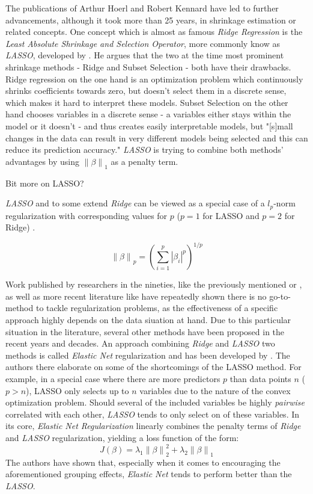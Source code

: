 \documentclass[12pt,a4paper]{article}
\newenvironment{lightbluebox}{%
    \begin{tcolorbox}[colback=lightblue, colframe=lightblue, fontupper=\itshape]%
}{%
    \end{tcolorbox}%
}
\newcommand{\norm}[1]{\left\lVert#1\right\rVert}
\begin{document}
The publications of Arthur Hoerl and Robert Kennard have led to further advancements, although it took more than 25 years, in shrinkage estimation or related concepts. One concept which is almost as famous \textit{Ridge Regression} is the \textit{Least Absolute Shrinkage and Selection Operator}, more commonly know as \textit{LASSO}, developed by \textcite{Tibishirani1996}. He argues that the two at the time most prominent shrinkage methods - Ridge and Subset Selection - both have their drawbacks. Ridge regression on the one hand is an optimization problem which continuously shrinks coefficients towards zero, but doesn't select them in a discrete sense, which makes it hard to interpret these models. Subset Selection on the other hand chooses variables in a discrete sense - a variables either stays within the model or it doesn't - and thus creates easily interpretable models, but "[s]mall changes in the data can result in very different models being selected and this can reduce its prediction accuracy." \parencite{Tibishirani1996} \textit{LASSO} is trying to combine both methods' advantages by using $\norm{\beta}_1$ as a penalty term.\\
\begin{lightbluebox}
Bit more on LASSO?
\end{lightbluebox}

\textit{LASSO} and to some extend \textit{Ridge} can be viewed as a special case of a $l_p$-norm regularization with corresponding values for $p$ ($p = 1$ for LASSO and $p=2$ for Ridge) \parencite{FrankFriedman1993}. 

$$\norm{\beta}_p =  \left(\sum_{i=1}^p|\beta_i|^p\right)^{1/p}$$

Work published by researchers in the nineties, like the previously mentioned \textcite{FrankFriedman1993} or \textcite{Fu1998}, as well as more recent literature like \textcite{WangEtAl2020} have repeatedly shown there is no go-to-method to tackle regularization problems, as the effectiveness of a specific approach highly depends on the data siuation at hand. Due to this particular situation in the literature, several other methods have been proposed in the recent years and decades. An approach combining \textit{Ridge} and \textit{LASSO} two methods is called \textit{Elastic Net} regularization and has been developed by \textcite{ZouHastie2005}. The authors there elaborate on some of the shortcomings of the LASSO method. For example, in a special case where there are more predictors $p$ than data points $n$ ($p > n$), LASSO only selects up to $n$ variables due to the nature of the convex optimization problem. Should several of the included variables be highly \textit{pairwise} correlated with each other, \textit{LASSO} tends to only select on of these variables. In its core, \textit{Elastic Net Regularization} linearly combines the penalty terms of \textit{Ridge} and \textit{LASSO} regularization, yielding a loss function of the form:\\
$$J(\beta) = \lambda_1 \norm{\beta}_2^2 + \lambda_2 \norm{\beta}_1$$
The authors have	 shown that, especially when it comes to encouraging the aforementioned grouping effects, \textit{Elastic Net} tends to perform better than the \textit{LASSO}.\\
\end{document}
